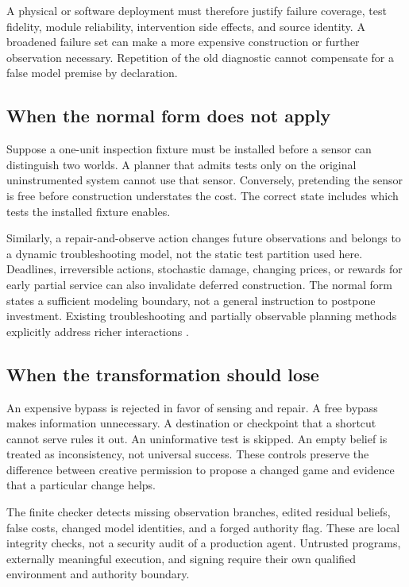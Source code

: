 \documentclass[11pt,letterpaper]{article}
\theoremstyle{remark}\newtheorem{remark}{Remark}[section]
\begin{document}
A physical or software deployment must therefore justify failure coverage, test fidelity, module reliability, intervention side effects, and source identity. A broadened failure set can make a more expensive construction or further observation necessary. Repetition of the old diagnostic cannot compensate for a false model premise by declaration.

\subsection{When the normal form does not apply}
Suppose a one-unit inspection fixture must be installed before a sensor can distinguish two worlds. A planner that admits tests only on the original uninstrumented system cannot use that sensor. Conversely, pretending the sensor is free before construction understates the cost. The correct state includes which tests the installed fixture enables.

Similarly, a repair-and-observe action changes future observations and belongs to a dynamic troubleshooting model, not the static test partition used here. Deadlines, irreversible actions, stochastic damage, changing prices, or rewards for early partial service can also invalidate deferred construction. The normal form states a sufficient modeling boundary, not a general instruction to postpone investment. Existing troubleshooting and partially observable planning methods explicitly address richer interactions \citep{breese,kaelbling}.

\subsection{When the transformation should lose}
An expensive bypass is rejected in favor of sensing and repair. A free bypass makes information unnecessary. A destination or checkpoint that a shortcut cannot serve rules it out. An uninformative test is skipped. An empty belief is treated as inconsistency, not universal success. These controls preserve the difference between creative permission to propose a changed game and evidence that a particular change helps.

The finite checker detects missing observation branches, edited residual beliefs, false costs, changed model identities, and a forged authority flag. These are local integrity checks, not a security audit of a production agent. Untrusted programs, externally meaningful execution, and signing require their own qualified environment and authority boundary.
\end{document}
